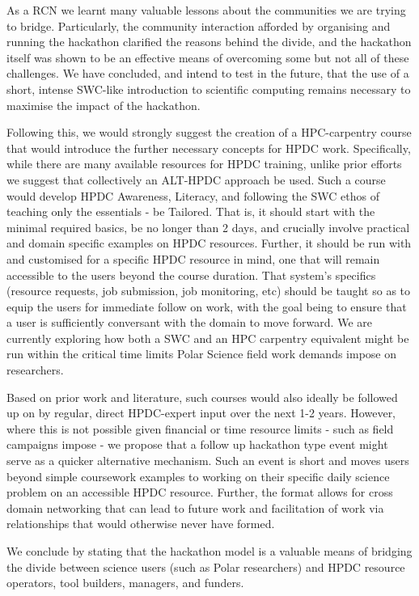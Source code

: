 \documentclass[conference]{IEEEtran}
\begin{document}
As a RCN we learnt many valuable lessons about the communities we are trying to bridge.  Particularly, the community interaction afforded by organising and running the hackathon clarified the reasons behind the divide, and the hackathon itself was shown to be an effective means of overcoming some but not all of these challenges.  We have concluded, and intend to test in the future, that the use of a short, intense SWC-like introduction to scientific computing remains necessary to maximise the impact of the hackathon.  

Following this, we would strongly suggest the creation of a HPC-carpentry course that would introduce the further necessary concepts for HPDC work.  Specifically, while there are many available resources for HPDC training, unlike prior efforts we suggest that collectively an ALT-HPDC approach be used.  Such a course would develop HPDC Awareness, Literacy, and following the SWC ethos of teaching only the essentials - be Tailored.  That is, it should start with the minimal required basics, be no longer than 2 days, and crucially involve practical and domain specific examples on HPDC resources.  Further, it should be run with and customised for a specific HPDC resource in mind, one that will remain accessible to the users beyond the course duration. That system’s specifics (resource requests, job submission, job monitoring, etc) should be taught so as to equip the users for immediate follow on work, with the goal being to ensure that a user is sufficiently conversant with the domain to move forward.  We are currently exploring how both a SWC and an HPC carpentry equivalent might be run within the critical time limits Polar Science field work demands impose on researchers.  

Based on prior work and literature, such courses would also ideally be followed up on by regular, direct HPDC-expert input over the next 1-2 years.  However, where this is not possible given financial or time resource limits - such as field campaigns impose - we propose that a follow up hackathon type event might serve as a quicker alternative mechanism. Such an event is short and moves users beyond simple coursework examples to working on their specific daily science problem on an accessible HPDC resource. Further, the format allows for cross domain networking that can lead to future work and facilitation of work via relationships that would otherwise never have formed.

We conclude by stating that the hackathon model is a valuable means of bridging the divide between science users (such as Polar researchers) and HPDC resource operators, tool builders, managers, and funders.  
\end{document}
